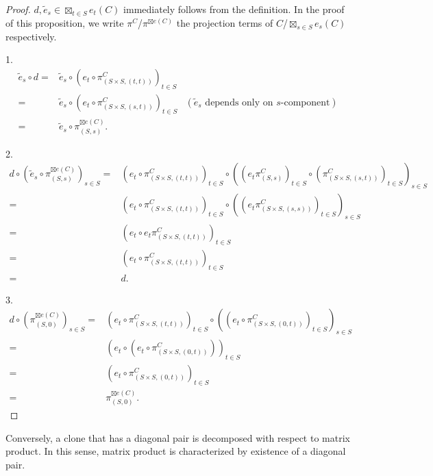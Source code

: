 \documentclass[a4paper,10pt]{article}
\theoremstyle{definition}
\begin{document}
\begin{proof}
$d,\tilde{e}_s\in\boxtimes_{t\in S} e_t(C)$ immediately follows from the definition.
In the proof of this proposition, we write 
$\pi^C$/$\pi^{\boxtimes e(C)}$ the projection terms of
$C$/$\boxtimes_{s\in S}e_s(C)$ respectively.

1. 
\begin{align*}
\tilde{e}_s\circ d
=& \tilde{e}_s\circ (e_t\circ \pi_{(S\times S,(t,t))}^C)_{t\in S}&\\
=& \tilde{e}_s\circ (e_t\circ \pi_{(S\times S,(s,t))}^C)_{t\in S}&
  (\tilde{e}_s\text{ depends only on }s\text{-component})\\
=&\tilde{e}_s\circ \pi_{(S,s)}^{\boxtimes e(C)}.&
\end{align*}

2. 
\begin{align*}
d\circ (\tilde{e}_s\circ \pi_{(S,s)}^{\boxtimes e(C)})_{s\in S}
=& (e_t\circ \pi_{(S\times S,(t,t))}^C)_{t\in S}
  \circ ((e_t\pi_{(S,s)}^C)_{t\in S}
          \circ (\pi_{(S\times S,(s,t))}^C)_{t\in S})_{s\in S}\\
=& (e_t\circ \pi_{(S\times S,(t,t))}^C)_{t\in S}
  \circ ((e_t\pi_{(S\times S,(s,s))}^C)_{t\in S})_{s\in S}\\
=& (e_t\circ e_t\pi_{(S\times S,(t,t))}^C)_{t\in S}\\
=& (e_t\circ \pi_{(S\times S,(t,t))}^C)_{t\in S}\\
=& d.
\end{align*}

3.
\begin{align*}
d\circ (\pi_{(S,0)}^{\boxtimes e(C)})_{s\in S}
=& (e_t\circ \pi_{(S\times S,(t,t))}^C)_{t\in S}
  \circ ((e_t\circ \pi_{(S\times S,(0,t))}^C)_{t\in S})_{s\in S}\\
=& (e_t\circ (e_t\circ \pi_{(S\times S,(0,t))}^C))_{t\in S}\\
=& (e_t\circ \pi_{(S\times S,(0,t))}^C)_{t\in S}\\
=& \pi_{(S,0)}^{\boxtimes e(C)}.
\end{align*}
\end{proof}

Conversely, a clone that has a diagonal pair
is decomposed with respect to matrix product.
In this sense, matrix product is characterized by existence
of a diagonal pair.
\end{document}
